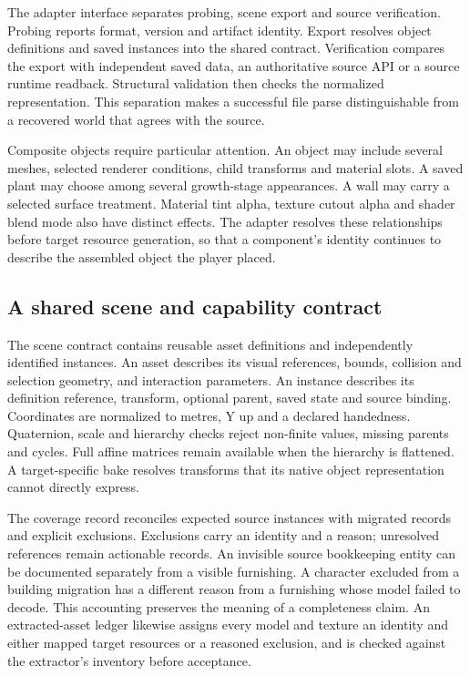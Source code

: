 \documentclass[11pt]{article}
\begin{document}
The adapter interface separates probing, scene export and source verification.
Probing reports format, version and artifact identity. Export resolves object
definitions and saved instances into the shared contract. Verification compares
the export with independent saved data, an authoritative source API or a source
runtime readback. Structural validation then checks the normalized representation.
This separation makes a successful file parse distinguishable from a recovered
world that agrees with the source.

Composite objects require particular attention. An object may include several
meshes, selected renderer conditions, child transforms and material slots. A
saved plant may choose among several growth-stage appearances. A wall may carry
a selected surface treatment. Material tint alpha, texture cutout alpha and
shader blend mode also have distinct effects. The adapter resolves these
relationships before target resource generation, so that a component's identity
continues to describe the assembled object the player placed.

\subsection{A shared scene and capability contract}

The scene contract contains reusable asset definitions and independently
identified instances. An asset describes its visual references, bounds,
collision and selection geometry, and interaction parameters. An instance
describes its definition reference, transform, optional parent, saved state and
source binding. Coordinates are normalized to metres, Y up and a declared
handedness. Quaternion, scale and hierarchy checks reject non-finite values,
missing parents and cycles. Full affine matrices remain available when the
hierarchy is flattened. A target-specific bake resolves transforms that its
native object representation cannot directly express.

The coverage record reconciles expected source instances with migrated records
and explicit exclusions. Exclusions carry an identity and a reason; unresolved
references remain actionable records. An invisible source bookkeeping entity
can be documented separately from a visible furnishing. A character excluded
from a building migration has a different reason from a furnishing whose model
failed to decode. This accounting preserves the meaning of a completeness claim.
An extracted-asset ledger likewise assigns every model and texture an identity
and either mapped target resources or a reasoned exclusion, and is checked
against the extractor's inventory before acceptance.
\end{document}
